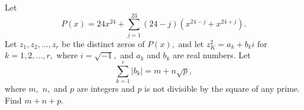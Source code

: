 Let
\[P(x)=24x^{24}+\sum_{j=1}^{23}(24-j)(x^{24-j}+x^{24+j}). \]
Let $z_{1},z_{2},\ldots,z_{r}$ be the distinct zeros of $P(x),$ and let $z_{K}^{2}=a_{k}+b_{k}i$ for $k=1,2,\ldots,r,$ where $i=\sqrt{-1},$ and $a_{k}$ and $b_{k}$ are real numbers. Let
\[\sum_{k=1}^{r}|b_{k}|=m+n\sqrt{p}, \]
where $m,$ $n,$ and $p$ are integers and $p$ is not divisible by the square of any prime. Find $m+n+p.$
